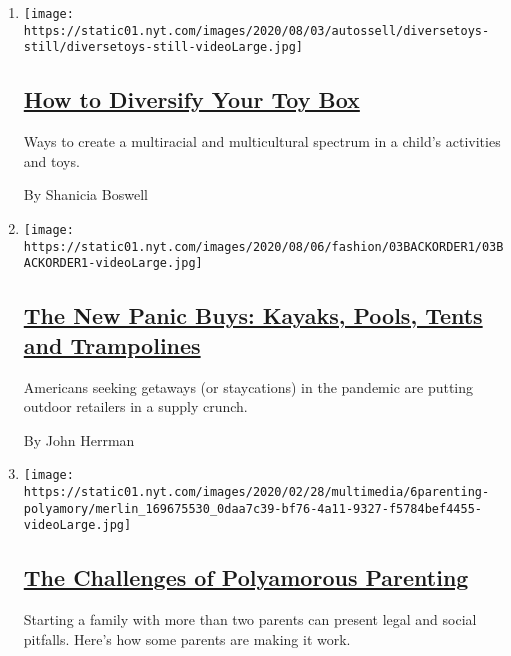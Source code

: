 \begin{enumerate}
\def\labelenumi{\arabic{enumi}.}
\item
  \texttt{[image: https://static01.nyt.com/images/2020/08/03/autossell/diversetoys-still/diversetoys-still-videoLarge.jpg]}

  \hypertarget{how-to-diversify-your-toy-box}{%
  \subsection{\texorpdfstring{\href{/2020/08/03/parenting/multiracial-toys-diversity-play.html}{How
  to Diversify Your Toy
  Box}}{How to Diversify Your Toy Box}}\label{how-to-diversify-your-toy-box}}

  Ways to create a multiracial and multicultural spectrum in a child's
  activities and toys.

  By Shanicia Boswell
\item
  \texttt{[image: https://static01.nyt.com/images/2020/08/06/fashion/03BACKORDER1/03BACKORDER1-videoLarge.jpg]}

  \hypertarget{the-new-panic-buys-kayaks-pools-tents-and-trampolines}{%
  \subsection{\texorpdfstring{\href{/2020/08/04/style/outdoor-camping-gear-pools-backordered.html}{The
  New Panic Buys: Kayaks, Pools, Tents and
  Trampolines}}{The New Panic Buys: Kayaks, Pools, Tents and Trampolines}}\label{the-new-panic-buys-kayaks-pools-tents-and-trampolines}}

  Americans seeking getaways (or staycations) in the pandemic are
  putting outdoor retailers in a supply crunch.

  By John Herrman
\item
  \texttt{[image: https://static01.nyt.com/images/2020/02/28/multimedia/6parenting-polyamory/merlin\_169675530\_0daa7c39-bf76-4a11-9327-f5784bef4455-videoLarge.jpg]}

  \hypertarget{the-challenges-of-polyamorous-parenting}{%
  \subsection{\texorpdfstring{\href{/2020/08/04/parenting/polyamorous-parenting.html}{The
  Challenges of Polyamorous
  Parenting}}{The Challenges of Polyamorous Parenting}}\label{the-challenges-of-polyamorous-parenting}}

  Starting a family with more than two parents can present legal and
  social pitfalls. Here's how some parents are making it work.


\end{enumerate}
